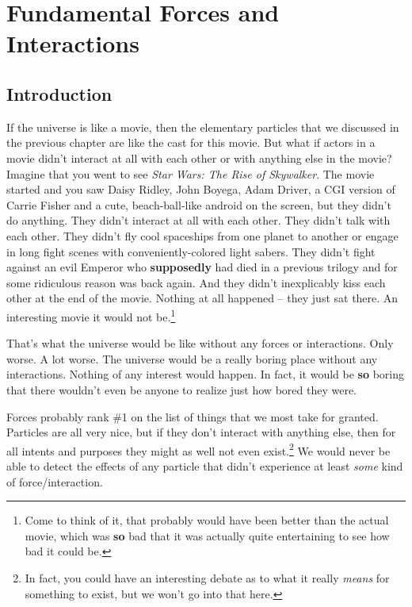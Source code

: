


\chapter[Fund.\ Forces and Interactions]{Fundamental Forces and Interactions}
\label{chapter:quarks}

\section{Introduction}


If the universe is like a movie, then the elementary particles
that we discussed in the previous chapter are like the cast for
this movie.  But what if actors in a movie didn't interact at all
with each other or with anything else in the movie?  Imagine that
you went to see {\it Star Wars:  The Rise of Skywalker}.
The movie started and you saw Daisy Ridley, John Boyega, 
Adam Driver, a CGI version of Carrie Fisher and a cute, beach-ball-like android 
on the screen, but they didn't do anything.  They
didn't interact at all with each other.  They didn't talk with
each other.  They didn't fly cool spaceships from one planet to
another or engage in long fight scenes with conveniently-colored
light sabers.  They didn't fight against an evil Emperor who {\bf supposedly}
had died in a previous trilogy and for some ridiculous reason was
back again.  And they didn't inexplicably kiss each other at the
end of the movie. Nothing at all happened -- they just sat there.   An
interesting movie it would not be.\footnote{Come to think of it, that probably
would have been better than the actual movie, which was {\bf so}
bad that it was actually quite entertaining to see how bad it could
be.}

That's what the universe would be like without any forces or
interactions.  Only worse.  A lot worse.  The universe would be a
really boring place without any interactions.  Nothing of any
interest would happen.  In fact, it would be {\bf so} boring that
there wouldn't even be anyone to realize just how bored they were.

Forces probably rank \#1 on the list of things that we most take
for granted.  Particles are all very nice, but if they don't
interact with anything else, then for all intents and purposes
they might as well not even exist.\footnote{In fact, you could
have an interesting debate as to what it really {\it means} for
something to exist, but we won't go into that here.} We would
never be able to detect the effects of any particle that didn't
experience at least {\it some} kind of force/interaction.

